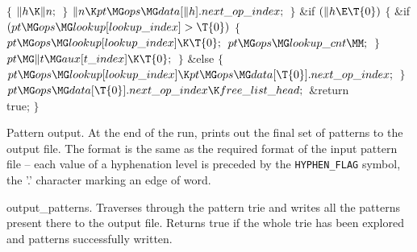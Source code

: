 ${}\{{}$\1\6
${}\|h\K\|n;{}$\6
\4${}\}{}$\2\6
${}\|n\K\\{pt}\MG\\{ops}\MG\\{data}[\|h].\\{next\_op\_index};{}$\6
\4${}\}{}$\2\6
\&{if} ${}(\|h\E\T{0}){}$\5
${}\{{}$\1\6
\&{if} ${}(\\{pt}\MG\\{ops}\MG\\{lookup}[\\{lookup\_index}]>\T{0}){}$\5
${}\{{}$\1\6
${}\\{pt}\MG\\{ops}\MG\\{lookup}[\\{lookup\_index}]\K\T{0};{}$\6
${}\\{pt}\MG\\{ops}\MG\\{lookup\_cnt}\MM;{}$\6
\4${}\}{}$\2\6
${}\\{pt}\MG\|t\MG\\{aux}[\\{t\_index}]\K\T{0};{}$\6
\4${}\}{}$\2\6
\&{else}\5
${}\{{}$\1\6
${}\\{pt}\MG\\{ops}\MG\\{lookup}[\\{lookup\_index}]\K\\{pt}\MG\\{ops}\MG%
\\{data}[\T{0}].\\{next\_op\_index};{}$\6
\4${}\}{}$\2\6
${}\\{pt}\MG\\{ops}\MG\\{data}[\T{0}].\\{next\_op\_index}\K\\{free\_list%
\_head};{}$\6
\&{return} \\{true};\6
\4${}\}{}$\2\par
\fi

Pattern output.
At the end of the run, \utfpatgen{} prints out the final set of patterns to the
output file. The format is the same as
the required format of the input pattern file -- each value of a hyphenation
level is preceded by the
{\tt HYPHEN\_FLAG} symbol, the '.' character marking an edge of word.

\fi

output\_patterns.
Traverses through the pattern trie and writes all the patterns present there to
the output file. Returns true if the
whole trie has been explored and patterns successfully written.

